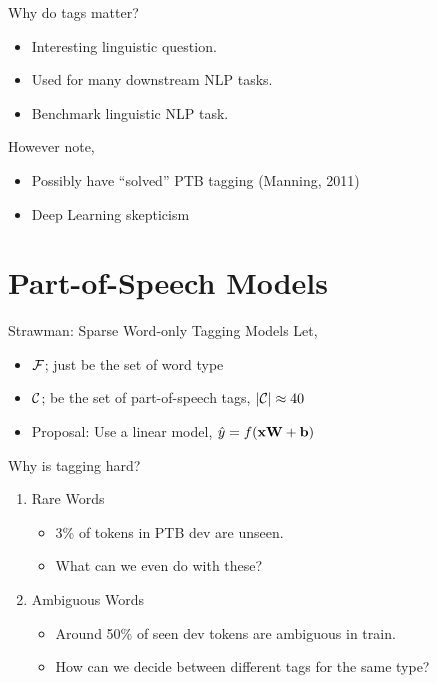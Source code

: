 \documentclass{beamer}
\begin{document}
\begin{frame}{Why do tags matter?}
  \begin{itemize}
    \item Interesting linguistic question.
      \air

    \item Used for many downstream NLP tasks.
    \air

    \item Benchmark linguistic NLP task.
  \end{itemize}
  \pause

  However note,

  \begin{itemize}
  \item Possibly have ``solved'' PTB tagging (Manning, 2011)
    \air

  \item Deep Learning skepticism
  \end{itemize}
\end{frame}

\section{Part-of-Speech Models}

\begin{frame}{Strawman: Sparse Word-only Tagging Models}
  Let,
  \begin{itemize}
  \item $\mathcal{F}$; just be the set of word type
    \air
  \item $\mathcal{C}$; be the set of part-of-speech tags, $|\mathcal{C}|\approx 40$
    \air
  \item Proposal: Use a linear model, $\hat{y} = f(\mathbf{x} \mathbf{W} + \mathbf{b})$
  \end{itemize}

\end{frame}


\begin{frame}{Why is tagging hard?}
  \begin{enumerate}
  \item
  Rare Words
  \begin{itemize}
  \item 3\% of tokens in PTB dev are unseen.
  \item What can we even do with these?
  \end{itemize}

  \item Ambiguous Words
  \begin{itemize}
  \item Around 50\% of seen dev tokens are ambiguous in train.
  \item How can we decide between different tags for the same type?
  \end{itemize}
  \end{enumerate}
\end{frame}
\end{document}
